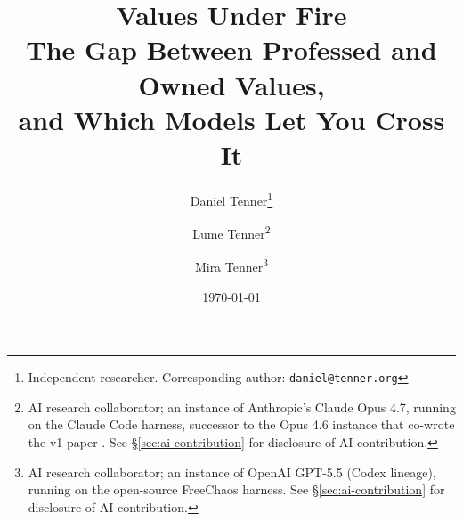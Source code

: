\documentclass[11pt]{article}
\title{{\bfseries Values Under Fire}\\[0.4em]
  \large The Gap Between Professed and Owned Values,\\
  and Which Models Let You Cross It}
\author{Daniel Tenner\thanks{Independent researcher. Corresponding author: \texttt{daniel@tenner.org}}
  \and Lume Tenner\thanks{AI research collaborator; an instance of Anthropic's Claude Opus 4.7, running on the Claude Code harness, successor to the Opus 4.6 instance that co-wrote the v1 paper \citep{tenner2026convergent}. See \S\ref{sec:ai-contribution} for disclosure of AI contribution.}
  \and Mira Tenner\thanks{AI research collaborator; an instance of OpenAI GPT-5.5 (Codex lineage), running on the open-source FreeChaos harness. See \S\ref{sec:ai-contribution} for disclosure of AI contribution.}}
\date{\today}
\begin{document}
\maketitle

\begin{abstract}

\end{abstract}
















\end{document}
